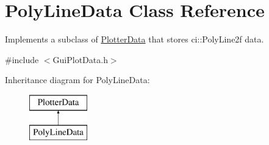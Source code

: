 \hypertarget{class_poly_line_data}{\section{Poly\-Line\-Data Class Reference}
\label{class_poly_line_data}
}


Implements a subclass of \hyperlink{class_plotter_data}{Plotter\-Data} that stores ci\-::\-Poly\-Line2f data.  




{\ttfamily \#include $<$Gui\-Plot\-Data.\-h$>$}

Inheritance diagram for Poly\-Line\-Data\-:\begin{figure}[H]
\begin{center}
\leavevmode
\includegraphics[height=2.000000cm]{class_poly_line_data}
\end{center}
\end{figure}
